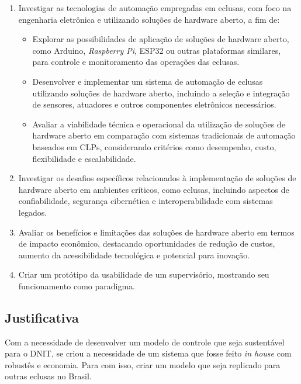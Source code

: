 \begin{enumerate}
    \item Investigar as tecnologias de automação empregadas em eclusas, com foco na engenharia eletrônica e utilizando soluções de hardware aberto, a fim de:
    \begin{itemize}
        \item Explorar as possibilidades de aplicação de soluções de hardware aberto, como Arduino, \textit{Raspberry Pi}, ESP32 ou outras plataformas similares, para controle e monitoramento das operações das eclusas.
        \item Desenvolver e implementar um sistema de automação de eclusas utilizando soluções de hardware aberto, incluindo a seleção e integração de sensores, atuadores e outros componentes eletrônicos necessários.
        \item Avaliar a viabilidade técnica e operacional da utilização de soluções de hardware aberto em comparação com sistemas tradicionais de automação baseados em CLPs, considerando critérios como desempenho, custo, flexibilidade e escalabilidade.
    \end{itemize}
    
    \item Investigar os desafios específicos relacionados à implementação de soluções de hardware aberto em ambientes críticos, como eclusas, incluindo aspectos de confiabilidade, segurança cibernética e interoperabilidade com sistemas legados.
    
    \item Avaliar os benefícios e limitações das soluções de hardware aberto em termos de impacto econômico, destacando oportunidades de redução de custos, aumento da acessibilidade tecnológica e potencial para inovação.
    
    \item Criar um protótipo da usabilidade de um supervisório, mostrando seu funcionamento como paradigma.
\end{enumerate}


\subsection{Justificativa}

Com a necessidade de desenvolver um modelo de controle que seja sustentável para o DNIT, se criou a necessidade de um sistema que fosse feito \textit{in house} com robustês e economia. Para com isso, criar um modelo que seja replicado para outras eclusas no Brasil. 




